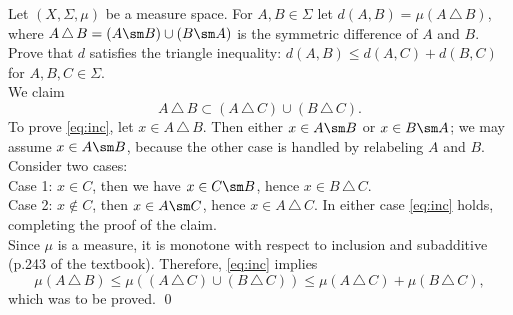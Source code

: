 \begin{hwsol}
Let $(X,\Sigma,\mu)$ be a measure space. For $A,B \in \Sigma$ let $d(A, B)= \mu(A \,\triangle\, B)$, where $A \,\triangle\, B= (A \sm B)\cup (B \sm A)$ is the symmetric difference of $A$ and $B$. Prove that $d$ satisfies the triangle inequality: $d(A, B) \leq d(A, C) + d(B, C)$ for $A, B, C \in \Sigma$. \\

\pf We claim
        \begin{equation} \label{eq:inc}
        A \,\triangle\, B \subset (A \,\triangle\, C) \cup (B \,\triangle\, C).
        \end{equation}
To prove \eqref{eq:inc}, let $x \in A \,\triangle\, B$. Then either $x\in A \sm B$ or $x\in B \sm A$; we may assume $x\in A\sm B$, because the other case is handled by relabeling $A$ and $B$.  Consider two cases: \\

\noindent Case 1: $x \in C$, then we have $x \in C \sm B$, hence $x \in B \,\triangle\, C$. \\

\noindent Case 2:  $x \notin C$, then $x \in A \sm C$, hence $x \in A \,\triangle\, C$. In either case \eqref{eq:inc} holds, completing the proof of the claim. \\

Since $\mu$ is a measure, it is monotone with respect to inclusion and subadditive (p.243 of the textbook). Therefore, \eqref{eq:inc} implies
        \[ 
        \mu(A \,\triangle\, B) \leq \mu( (A \,\triangle\, C) \cup (B \,\triangle\, C)) \leq \mu(A \,\triangle\, C)  + \mu(B \,\triangle\, C),
        \]
which was to be proved. \qed \\
\end{hwsol}
 

